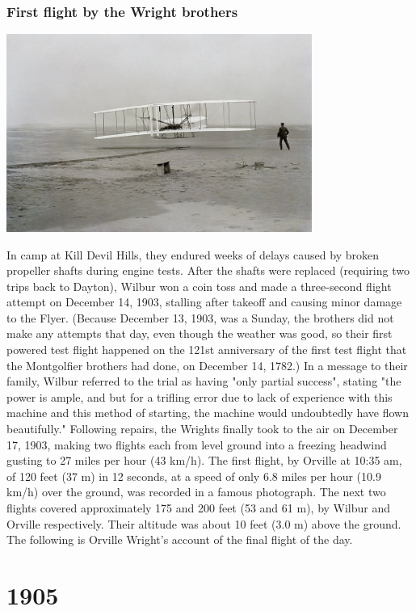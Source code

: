 \documentclass[11pt]{report}
\begin{document}
\subsection{First flight by the Wright brothers}
\vspace{2mm}\begin{center}\includegraphics[width=10cm]{./img/firstflight.jpg}\end{center}
In camp at Kill Devil Hills, they endured weeks of delays caused by broken propeller shafts during engine tests. After the shafts were replaced (requiring two trips back to Dayton), Wilbur won a coin toss and made a three-second flight attempt on December 14, 1903, stalling after takeoff and causing minor damage to the Flyer. (Because December 13, 1903, was a Sunday, the brothers did not make any attempts that day, even though the weather was good, so their first powered test flight happened on the 121st anniversary of the first test flight that the Montgolfier brothers had done, on December 14, 1782.) In a message to their family, Wilbur referred to the trial as having "only partial success", stating "the power is ample, and but for a trifling error due to lack of experience with this machine and this method of starting, the machine would undoubtedly have flown beautifully." Following repairs, the Wrights finally took to the air on December 17, 1903, making two flights each from level ground into a freezing headwind gusting to 27 miles per hour (43 km/h). The first flight, by Orville at 10:35 am, of 120 feet (37 m) in 12 seconds, at a speed of only 6.8 miles per hour (10.9 km/h) over the ground, was recorded in a famous photograph. The next two flights covered approximately 175 and 200 feet (53 and 61 m), by Wilbur and Orville respectively. Their altitude was about 10 feet (3.0 m) above the ground. The following is Orville Wright's account of the final flight of the day.

\chapter{1905}
\end{document}
